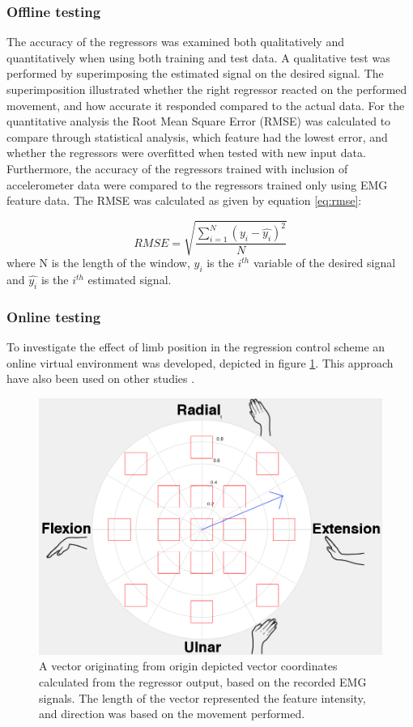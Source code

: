 \begin{multicols}{2}
\subsubsection*{Offline testing}
The accuracy of the regressors was examined both qualitatively and quantitatively when using both training and test data. A qualitative test was performed by superimposing the estimated signal on the desired signal. The superimposition illustrated whether the right regressor reacted on the performed movement, and how accurate it responded compared to the actual data. For the quantitative analysis the Root Mean Square Error (RMSE) was calculated to compare through statistical analysis, which feature had the lowest error, and whether the regressors were overfitted when tested with new input data. Furthermore, the accuracy of the regressors trained with inclusion of accelerometer data were compared to the regressors trained only using EMG feature data. The RMSE was calculated as given by equation \ref{eq:rmse}:

\begin{equation} \label{eq:rmse}
RMSE = \sqrt{\frac{\sum\limits_{i=1}^N(y_i - \hat{y_i})^2}{N}}
\end{equation}
where N is the length of the window, $y_i$ is the $i^{th}$ variable of the desired signal and $\hat{y_i}$ is the $i^{th}$ estimated signal.

\subsubsection*{Online testing}
To investigate the effect of limb position in the regression control scheme an online virtual environment was developed, depicted in figure \ref{fig:targets}. This approach have also been used on other studies \cite{hahne2014, Hwang2017}.

\begin{figure}[H]
	\centering
	\includegraphics[scale=0.35]{figures/paperFigures/Target}
	\caption{A vector originating from origin depicted vector coordinates calculated from the regressor output, based on the recorded EMG signals. The length of the vector represented the feature intensity, and direction was based on the movement performed.}
	\label{fig:targets}
\end{figure}


\end{multicols}
